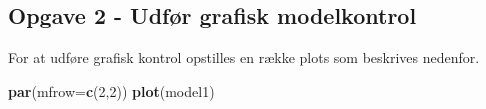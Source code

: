 \documentclass[
]{article}
\newenvironment{Shaded}{\begin{snugshade}}{\end{snugshade}}
\newcommand{\AttributeTok}[1]{\textcolor[rgb]{0.13,0.29,0.53}{#1}}
\newcommand{\DecValTok}[1]{\textcolor[rgb]{0.00,0.00,0.81}{#1}}
\newcommand{\FunctionTok}[1]{\textcolor[rgb]{0.13,0.29,0.53}{\textbf{#1}}}
\newcommand{\NormalTok}[1]{#1}
\begin{document}
\hypertarget{opgave-2---udfuxf8r-grafisk-modelkontrol}{%
\subsection{Opgave 2 - Udfør grafisk
modelkontrol}\label{opgave-2---udfuxf8r-grafisk-modelkontrol}}

For at udføre grafisk kontrol opstilles en række plots som beskrives
nedenfor.

\begin{Shaded}
\begin{Highlighting}[]
\FunctionTok{par}\NormalTok{(}\AttributeTok{mfrow=}\FunctionTok{c}\NormalTok{(}\DecValTok{2}\NormalTok{,}\DecValTok{2}\NormalTok{))}
\FunctionTok{plot}\NormalTok{(model1)}
\end{Highlighting}
\end{Shaded}
\end{document}
